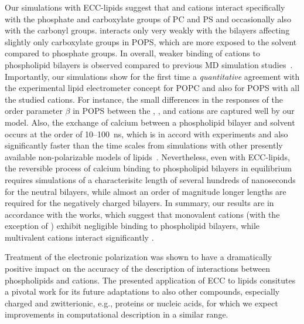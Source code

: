 Our simulations with ECC-lipids suggest that
 and  cations
interact specifically with the phosphate and carboxylate groups of PC and PS 
and occasionally also with the carbonyl groups. 
 interacts only very weakly with the bilayers
affecting slightly only carboxylate groups in POPS,
which are more exposed to the solvent compared to phosphate groups. 
In overall, weaker binding of cations to phospholipid bilayers is observed 
compared to previous MD simulation studies~\citep{nmrlipids_proj4, catte16, bockmann03, bockmann04, melcrova16, javanainen17}. 
Importantly,
our simulations show for the first time a \emph{quantitative} agreement with the experimental lipid electrometer concept
for POPC and also for POPS with all the studied cations. 
For instance, the small differences 
in the responses of the order parameter $\beta$ in POPS
between the 
, , and  cations
are captured well by our model. 
Also, the exchange of calcium between a phospholipid bilayer and solvent 
occurs at the order of 10--100~ns, 
which is in accord with experiments and also 
significantly faster than the time scales from simulations 
with other presently available non-polarizable models of lipids~\citep{melcrova16, javanainen17, catte16}. 
Nevertheless, even with ECC-lipids,
the reversible process of calcium binding to phospholipid bilayers in equilibrium
requires simulations of a characterisitc length of several hundreds of nanoseconds 
for the neutral bilayers,
while almost an order of magnitude longer lengths 
are required for the negatively charged bilayers. 
In summary,
our results are in accordance with the works,
which suggest that monovalent cations (with the exception of ) 
exhibit negligible binding to phospholipid bilayers, 
while multivalent cations interact significantly 
\citep{cevc90,tocanne90, hauser76,hauser78,herbette84,altenbach84,clarke99,binder02,pabst07,uhrikova08,filippov09}.


Treatment  of the electronic polarization 
was shown to have a dramatically positive impact on the accuracy of the description of interactions
between phospholipids and cations. 
The presented application of ECC to lipids
consitutes a pivotal work for its future adaptations 
to also other compounds, especially charged and zwitterionic, 
e.g., proteins or nucleic acids,
for which we expect improvements in computational description in a similar range. 

